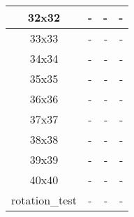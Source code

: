 \begin{center}
\begin{tabular}{|c|c|r|r|}
		32x32 & - & - & - \\ \hline
		33x33 & - & - & - \\ \hline
		34x34 & - & - & - \\ \hline
		35x35 & - & - & - \\ \hline
		36x36 & - & - & - \\ \hline
		37x37 & - & - & - \\ \hline
		38x38 & - & - & - \\ \hline
		39x39 & - & - & - \\ \hline
		40x40 & - & - & - \\ \hline
		rotation\_test & - & - & - \\ \hline

    \end{tabular}
\end{center}
